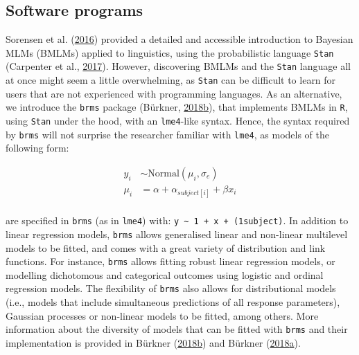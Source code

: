 \documentclass[a4paper,12pt,twoside,onecolumn,openright,final,oldfontcommands]{memoir}
\begin{document}
\hypertarget{software-programs}{%
\subsection{Software programs}\label{software-programs}}

Sorensen et al. (\protect\hyperlink{ref-sorensen_bayesian_2016}{2016}) provided a detailed and accessible introduction to Bayesian MLMs (BMLMs) applied to linguistics, using the probabilistic language \texttt{Stan} (Carpenter et al., \protect\hyperlink{ref-carpenter_stan_2017}{2017}). However, discovering BMLMs and the \texttt{Stan} language all at once might seem a little overwhelming, as \texttt{Stan} can be difficult to learn for users that are not experienced with programming languages. As an alternative, we introduce the \texttt{brms} package (Bürkner, \protect\hyperlink{ref-R-brms}{2018}\protect\hyperlink{ref-R-brms}{b}), that implements BMLMs in \texttt{R}, using \texttt{Stan} under the hood, with an \texttt{lme4}-like syntax. Hence, the syntax required by \texttt{brms} will not surprise the researcher familiar with \texttt{lme4}, as models of the following form:

\[
\begin{aligned}
y_{i} &\sim \mathrm{Normal}(\mu_{i}, \sigma_{e}) \\
\mu_{i} &= \alpha + \alpha_{subject[i]} + \beta x_{i} \\
\end{aligned}
\]

\vspace{5mm}

are specified in \texttt{brms} (as in \texttt{lme4}) with: \texttt{y\ \textasciitilde{}\ 1\ +\ x\ +\ (1\textbar{}subject)}. In addition to linear regression models, \texttt{brms} allows generalised linear and non-linear multilevel models to be fitted, and comes with a great variety of distribution and link functions. For instance, \texttt{brms} allows fitting robust linear regression models, or modelling dichotomous and categorical outcomes using logistic and ordinal regression models. The flexibility of \texttt{brms} also allows for distributional models (i.e., models that include simultaneous predictions of all response parameters), Gaussian processes or non-linear models to be fitted, among others. More information about the diversity of models that can be fitted with \texttt{brms} and their implementation is provided in Bürkner (\protect\hyperlink{ref-R-brms}{2018}\protect\hyperlink{ref-R-brms}{b}) and Bürkner (\protect\hyperlink{ref-burkner_advanced_2018}{2018}\protect\hyperlink{ref-burkner_advanced_2018}{a}).
\end{document}
